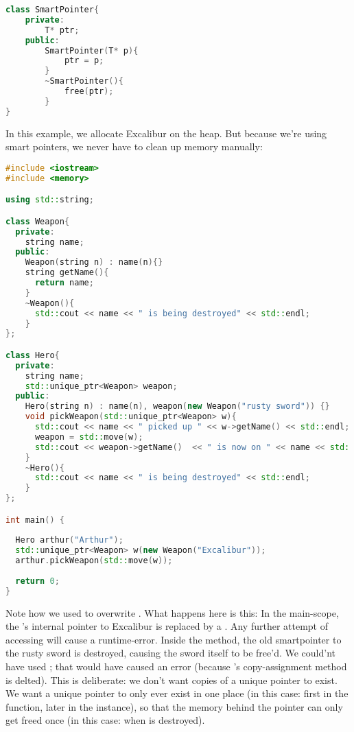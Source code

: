 \begin{lstlisting}[language=c++]
class SmartPointer{
    private:
        T* ptr;
    public:
        SmartPointer(T* p){
            ptr = p;
        }
        ~SmartPointer(){
            free(ptr);
        }
}
\end{lstlisting}

In this example, we allocate Excalibur on the heap. But because we're using smart pointers, we never have to clean up memory manually:
\begin{lstlisting}[language=c++]
#include <iostream>
#include <memory>

using std::string;

class Weapon{
  private:
    string name;
  public:
    Weapon(string n) : name(n){}
    string getName(){
      return name;
    }
    ~Weapon(){
      std::cout << name << " is being destroyed" << std::endl;
    }
};

class Hero{
  private:
    string name;
    std::unique_ptr<Weapon> weapon;
  public:
    Hero(string n) : name(n), weapon(new Weapon("rusty sword")) {}
    void pickWeapon(std::unique_ptr<Weapon> w){
      std::cout << name << " picked up " << w->getName() << std::endl;
      weapon = std::move(w);
      std::cout << weapon->getName()  << " is now on " << name << std::endl;
    }
    ~Hero(){
      std::cout << name << " is being destroyed" << std::endl;
    }
};

int main() {
  
  Hero arthur("Arthur");
  std::unique_ptr<Weapon> w(new Weapon("Excalibur"));
  arthur.pickWeapon(std::move(w));
  
  return 0;
}
\end{lstlisting}

Note how we used  to overwrite . What happens here is this: In the main-scope, the 's internal pointer to Excalibur is replaced by a . Any further attempt of accessing  will cause a runtime-error. Inside the  method, the old smartpointer to the rusty sword is destroyed, causing the sword itself to be free'd.  
We could'nt have used ; that would have caused an error (because 's copy-assignment method is delted). This is deliberate: we don't want copies of a unique pointer to exist. We want a unique pointer to only ever exist in one place (in this case: first in the  function, later in the  instance), so that the memory behind the pointer can only get freed once (in this case: when  is destroyed).

